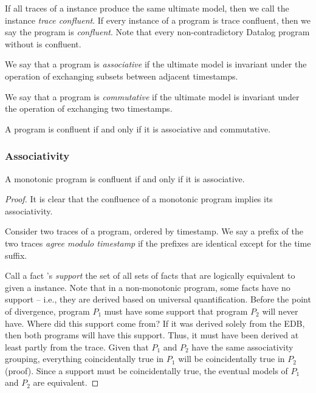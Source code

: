 If all traces of a \lang instance produce the same ultimate model, then we
call the instance {\em trace confluent}.  If every instance of a program is
trace confluent, then we say the program is {\em confluent}.  Note that every
non-contradictory Datalog program without  is confluent.

\begin{definition}
%
We say that a \lang program is {\em associative} if the
ultimate model is invariant under the operation of exchanging subsets between
adjacent timestamps.
%
\end{definition}

\begin{definition}
%
We say that a \lang program is {\em commutative} if the ultimate model is
invariant under the operation of exchanging two timestamps.
%
\end{definition}

\begin{lemma}
%
A \lang program is confluent if and only if it is associative and commutative.
%
\end{lemma}

\subsubsection{Associativity}

\begin{lemma}
%
A monotonic \lang program is confluent if and only if it is associative.
%
\end{lemma}
%
\begin{proof}
%
It is clear that the confluence of a monotonic \lang program implies its
associativity.

Consider two traces of a \lang program, ordered by timestamp.  We say a prefix
of the two traces {\em agree modulo timestamp} if the prefixes are identical
except for the time suffix.  


Call a fact 's {\em support} the set of all sets of facts that are
logically equivalent to  given a \lang instance.  Note that in a
non-monotonic program, some facts have no support -- i.e., they are derived
based on universal quantification.  Before the point of divergence, program
$P_1$ must have some support that program $P_2$ will never have.  Where did this
support come from?  If it was derived solely from the EDB, then both programs
will have this support.  Thus, it must have been derived at least partly from
the trace.  Given that $P_1$ and $P_2$  have the same
associativity grouping, everything coincidentally true in $P_1$ will be
coincidentally true in $P_2$ (proof).  Since a support must be coincidentally
true, the eventual models of $P_1$ and $P_2$ are equivalent.
%
\end{proof}

